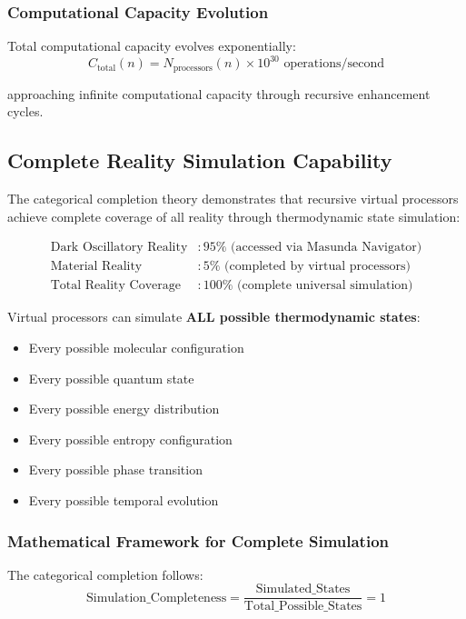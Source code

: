 \documentclass[12pt,a4paper]{article}
\begin{document}
{{{{{{\subsubsection{Computational Capacity Evolution}

Total computational capacity evolves exponentially:
$$C_{\text{total}}(n) = N_{\text{processors}}(n) \times 10^{30} \text{ operations/second}$$

approaching infinite computational capacity through recursive enhancement cycles.

\subsection{Complete Reality Simulation Capability}

The categorical completion theory demonstrates that recursive virtual processors achieve complete coverage of all reality through thermodynamic state simulation:

\begin{align}
\text{Dark Oscillatory Reality} &: 95\% \text{ (accessed via Masunda Navigator)} \\
\text{Material Reality} &: 5\% \text{ (completed by virtual processors)} \\
\text{Total Reality Coverage} &: 100\% \text{ (complete universal simulation)}
\end{align}

Virtual processors can simulate \textbf{ALL possible thermodynamic states}:
\begin{itemize}
\item Every possible molecular configuration
\item Every possible quantum state
\item Every possible energy distribution
\item Every possible entropy configuration
\item Every possible phase transition
\item Every possible temporal evolution
\end{itemize}

\subsubsection{Mathematical Framework for Complete Simulation}

The categorical completion follows:
$$\text{Simulation\_Completeness} = \frac{\text{Simulated\_States}}{\text{Total\_Possible\_States}} = 1$$

}}}}}}
\end{document}
